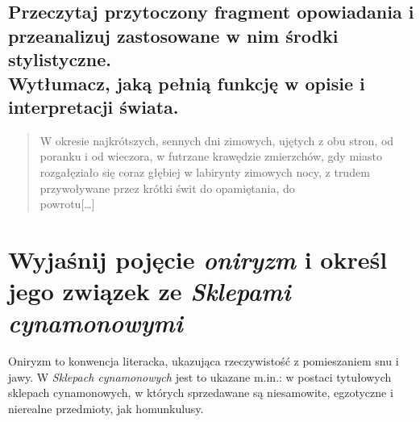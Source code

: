 \documentclass[a4paper]{article}
\begin{document}
\subsection{Przeczytaj przytoczony fragment opowiadania i prze\-analizuj zastosowane w nim środki stylistyczne.\\Wytłumacz, jaką pełnią funkcję w opisie i interpretacji świa\-ta.}
\begin{quotation}
    W okresie najkrótszych, sennych dni zimowych, ujętych z obu stron, od poranku i od wieczora, w futrzane krawędzie zmierzchów, gdy miasto rozgałęziało się coraz głębiej w labirynty zimowych nocy, z trudem przywoływane przez krótki świt do opamiętania, do\\powrotu[\dots]
\end{quotation}
\begin{table}[H]
\end{table}
\section{Wyjaśnij pojęcie \emph{oniryzm} i określ jego związek ze \emph{Sklepami cynamonowymi}}
Oniryzm to konwencja literacka, ukazująca rzeczywistość z pomieszaniem snu i jawy. W \emph{Sklepach cynamonowych} jest to ukazane m.in.: w postaci tytułowych sklepach cynamonowych, w których sprzedawane są niesamowite, egzotyczne i nierealne przedmioty, jak homunkulusy.
\end{document}

